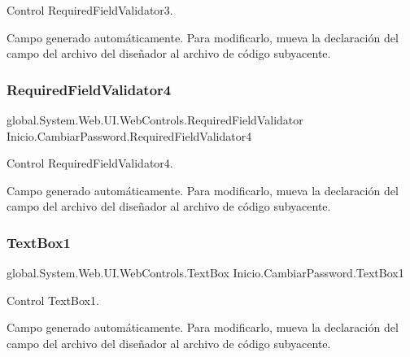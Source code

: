Control Required\+Field\+Validator3. 

Campo generado automáticamente. Para modificarlo, mueva la declaración del campo del archivo del diseñador al archivo de código subyacente. \mbox{\label{class_inicio_1_1_cambiar_password_a721210b960d80ff7c87c392dc8f4d78a}} 
\subsubsection{\texorpdfstring{RequiredFieldValidator4}{RequiredFieldValidator4}}
{\footnotesize\ttfamily global.\+System.\+Web.\+U\+I.\+Web\+Controls.\+Required\+Field\+Validator Inicio.\+Cambiar\+Password.\+Required\+Field\+Validator4\hspace{0.3cm}{\ttfamily [protected]}}



Control Required\+Field\+Validator4. 

Campo generado automáticamente. Para modificarlo, mueva la declaración del campo del archivo del diseñador al archivo de código subyacente. \mbox{\label{class_inicio_1_1_cambiar_password_ab827a758058e29a7846579183e4cbcea}} 
\subsubsection{\texorpdfstring{TextBox1}{TextBox1}}
{\footnotesize\ttfamily global.\+System.\+Web.\+U\+I.\+Web\+Controls.\+Text\+Box Inicio.\+Cambiar\+Password.\+Text\+Box1\hspace{0.3cm}{\ttfamily [protected]}}



Control Text\+Box1. 

Campo generado automáticamente. Para modificarlo, mueva la declaración del campo del archivo del diseñador al archivo de código subyacente. \mbox{\label{class_inicio_1_1_cambiar_password_a7eeeb21567b9f20fcb890fbffc4146f4}} 
